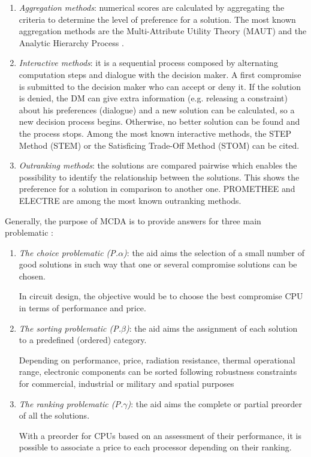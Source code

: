\begin{enumerate}
\item \textit{Aggregation methods}: numerical scores are calculated by aggregating the criteria to determine the level of preference for a solution. The most known aggregation methods are the Multi-Attribute Utility Theory (MAUT) \cite{MMAUT} and the Analytic Hierarchy Process \cite{MAHP}.
\item \textit{Interactive methods}: it is a sequential process composed by alternating computation steps and dialogue with the decision maker. A first compromise is submitted to the decision maker who can accept or deny it. If the solution is denied, the DM can give extra information (e.g. releasing a constraint) about his preferences (dialogue) and a new solution can be calculated, so a new decision process begins. Otherwise, no better solution can be found and the process stops. Among the most known interactive methods, the STEP Method (STEM) \cite{benayoun71} or the Satisficing Trade-Off Method (STOM) \cite{nakayama84} can be cited.
\item \textit{Outranking methods}: the solutions are compared pairwise which enables the possibility to identify the relationship between the solutions. This shows the preference for a solution in comparison to another one. PROMETHEE \cite{Brans1} and ELECTRE \cite{Roy66} are among the most known outranking methods.
\end{enumerate}


Generally, the purpose of MCDA is to provide answers for three main problematic \cite{EhrgottFigueiraGreco2005}:
\begin{enumerate}
\item \textit{The choice problematic (P.$\alpha$)}: the aid aims the selection of a small number of good solutions in such way that one or several compromise solutions can be chosen.
\begin{example}
In circuit design, the objective would be to choose the best compromise CPU in terms of performance and price.
\end{example}
\item \textit{The sorting problematic (P.$\beta$)}: the aid aims the assignment of each solution to a predefined (ordered) category.
\begin{example}
Depending on performance, price, radiation resistance, thermal operational range, electronic components can be sorted following robustness constraints for commercial, industrial or military and spatial purposes
\end{example}
\item \textit{The ranking problematic (P.$\gamma$)}: the aid aims the complete or partial preorder of all the solutions.
\begin{example}
With a preorder for CPUs based on an assessment of their performance, it is possible to associate a price to each processor depending on their ranking.
\end{example}
\end{enumerate}

